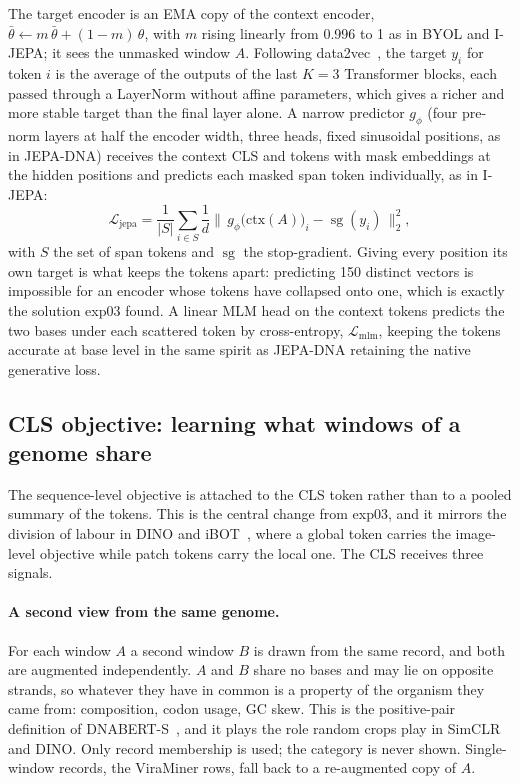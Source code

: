 \documentclass[10pt,twocolumn,a4paper]{article}
\begin{document}
The target encoder is an EMA copy of the context encoder,
$\bar\theta\leftarrow m\,\bar\theta+(1-m)\,\theta$, with $m$ rising linearly from
0.996 to 1 as in BYOL and I-JEPA; it sees the unmasked window $A$. Following
data2vec~\cite{baevski2022data2vec}, the target $y_i$ for token $i$ is the
average of the outputs of the last $K=3$ Transformer blocks, each passed through
a LayerNorm without affine parameters, which gives a richer and more stable
target than the final layer alone. A narrow predictor $g_\phi$ (four pre-norm
layers at half the encoder width, three heads, fixed sinusoidal positions, as in
JEPA-DNA) receives the context CLS and tokens with mask embeddings at the hidden
positions and predicts each masked span token individually, as in I-JEPA:
\begin{equation}
\mathcal{L}_{\text{jepa}}
 =\frac{1}{|S|}\sum_{i\in S}\frac{1}{d}
   \bigl\lVert\, g_\phi\bigl(\mathrm{ctx}(A)\bigr)_i-\operatorname{sg}(y_i)\,\bigr\rVert_2^2 ,
\end{equation}
with $S$ the set of span tokens and $\operatorname{sg}$ the stop-gradient. Giving
every position its own target is what keeps the tokens apart: predicting 150
distinct vectors is impossible for an encoder whose tokens have collapsed onto
one, which is exactly the solution exp03 found. A linear MLM head on the context
tokens predicts the two bases under each scattered token by cross-entropy,
$\mathcal{L}_{\text{mlm}}$, keeping the tokens accurate at base level in the same
spirit as JEPA-DNA retaining the native generative loss.

\subsection{CLS objective: learning what windows of a genome share}\label{sec:cls}

The sequence-level objective is attached to the CLS token rather than to a pooled
summary of the tokens. This is the central change from exp03, and it mirrors the
division of labour in DINO and iBOT~\cite{caron2021dino,zhou2022ibot}, where a
global token carries the image-level objective while patch tokens carry the local
one. The CLS receives three signals.

\paragraph{A second view from the same genome.}
For each window $A$ a second window $B$ is drawn from the same record, and both
are augmented independently. $A$ and $B$ share no bases and may lie on opposite
strands, so whatever they have in common is a property of the organism they came
from: composition, codon usage, GC skew. This is the positive-pair definition of
DNABERT-S~\cite{zhou2024dnaberts}, and it plays the role random crops play in
SimCLR~\cite{chen2020simclr} and DINO. Only record membership is used; the
category is never shown. Single-window records, the ViraMiner rows, fall back to
a re-augmented copy of $A$.
\end{document}
